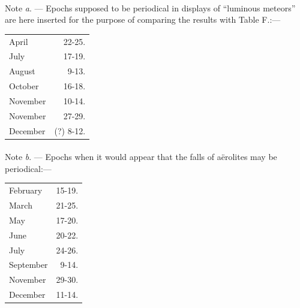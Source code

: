 \documentclass[a4paper, 12pt, oneside]{article}
\begin{document}
\paragraph{}
Note \emph{a}. --- Epochs supposed to be periodical in displays of ``luminous meteors'' are here inserted for the purpose of comparing the results with Table F.:---
\begin{table}[H]
    \centering
    \bfseries
    \Fontauri
    \begin{tabular}{l r}
        April & 22-25. \\
        July & 17-19. \\
        August & 9-13. \\
        October & 16-18. \\
        November & 10-14. \\
        November & 27-29. \\
        December & (?) 8-12. \\
    \end{tabular}
\end{table}
\paragraph{}
Note \emph{b}. --- Epochs when it would appear that the falls of aërolites may be periodical:---
\begin{table}[!ht]
    \centering
    \bfseries
    \Fontauri
    \begin{tabular}{l r}
        February & 15-19. \\
        March & 21-25. \\
        May & 17-20. \\
        June & 20-22. \\
        July & 24-26. \\
        September & 9-14. \\
        November & 29-30. \\
        December & 11-14. \\
    \end{tabular}
\end{table}
\clearpage  
\end{document}
